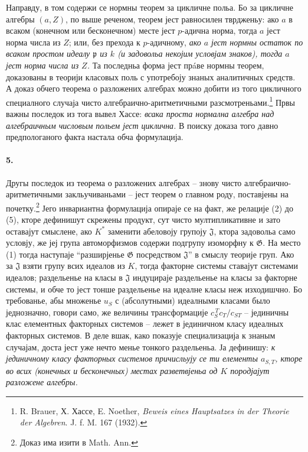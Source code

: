 ﻿\documentclass[11pt]{article}
\newcommand{\foreign}[1]{#1}
\begin{document}
Направду, в том содержи се нормны теорем за цикличне польа. Бо за цикличне алгебры \((a,Z)\), по выше реченом, теорем јест равносилен тврдженьу: ако \(a\) в всаком (конечном или бесконечном) месте јест \(p\)-адична норма, тогда \(a\) јест норма числа из \(Z\); или, без прехода к \(p\)-адичному, \emph{ако \(a\) јест нормны остаток по всаком простом идеалу \(\mathfrak p\) из \(k\) (и задовольа некојим условјам знаков), тогда \(a\) јест норма числа из \(Z\).} Та последньа форма јест прáве нормны теорем, доказованы в теорији класовых поль с употребоју знаных аналитичных средств. А доказ обчего теорема о разложених алгебрах можно добити из того цикличного специалного случаја чисто алгебраично-аритметичными разсмотреньами.\footnote{R. Brauer, Х. Хассе, E. Noether, \foreign{\emph{Beweis eines Hauptsatzes in der Theorie der Algebren}}. J. f. M. 167 (1932).} Првы важны последок из тога вывел Хассе: \emph{всака проста нормална алгебра над алгебраичным числовым польем јест циклична.} В поиску доказа того давно предпологаного факта настала обча формулација.

\paragraph{5.}
Другы последок из теорема о разложених алгебрах -- знову чисто алгебраично-аритметичными закльучиваньами -- јест теорем о главном роду, поставјены на почетку.\footnote{Доказ има изити в \foreign{Math. Ann.}} Јего инвариантна формулација опираје се на факт, же релације (2) до (5), кторе дефинишут скрежены продукт, сут чисто мултипликативне и зато оставајут смыслене, ако \(K^\ast\) заменити абеловоју групоју \(\mathfrak J\), ктора задовольа само условју, же јеј група автоморфизмов содержи подгрупу изоморфну к \(\mathfrak G\). На место (1) тогда наступаје ``разширјенье \(\mathfrak G\) посредством \(\mathfrak J\)'' в смыслу теорије груп. Ако за \(\mathfrak J\) взяти групу всих идеалов из \(K\), тогда факторне системы ставајут системами идеалов; раздельенье на класы в \(\mathfrak J\) индуцираје раздельенье на класы за факторне системы, и обче то јест тонше раздельенье на идеалне класы неж изходишчно. Бо требованье, абы множенье \(u_S\) с (абсолутными) идеалными класами было једнозначно, говори само, же величины трансформације \(c_S^{\,T}c_T/c_{ST}\) -- јединичны клас елементных факторных системов -- лежет в јединичном класу идеалных факторных системов. В деле вшак, како показује специализација к знаным случајам, доста јест уже нечто менье тонкого раздельеньа. Ја дефинишу: \emph{к јединичному класу факторных системов причисльују се ти елементы \(a_{S,T}\), кторе во всих (конечных и бесконечных) местах разветвјеньа од \(K\) породјајут разложене алгебры.}
\end{document}
